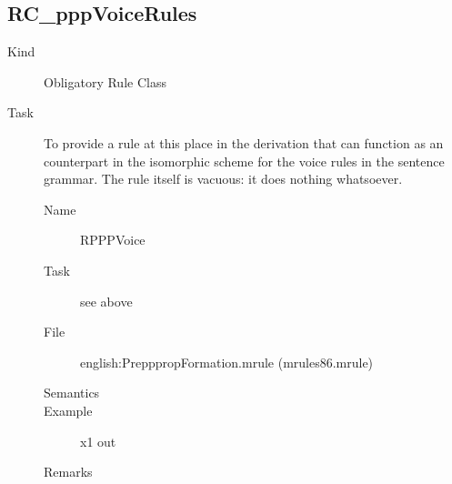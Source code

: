 \subsection{RC\_pppVoiceRules}
\begin{description}
\item[Kind] Obligatory Rule Class
\item[Task] To provide a rule at this place in the derivation that can function 
as an counterpart in the isomorphic scheme for the voice rules in the sentence 
grammar. The rule itself is vacuous: it does nothing whatsoever.

\vspace{1 cm}
\begin{description}
\item[Name] RPPPVoice
\item[Task] see above
\item[File] english:PrepppropFormation.mrule (mrules86.mrule)
\item[Semantics]
\item[Example] x1 out 
\item[Remarks]
\end{description}

\end{description}

\newpage
